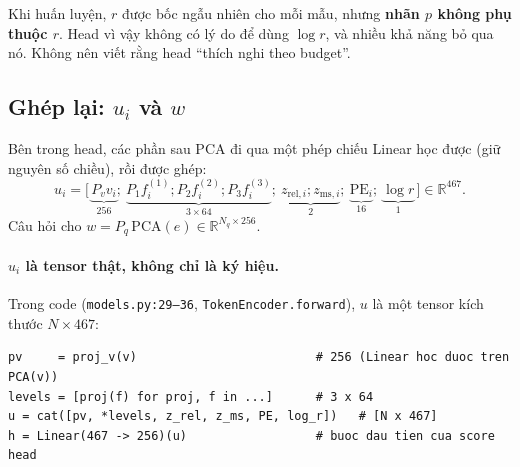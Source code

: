 \documentclass[11pt,a4paper]{article}
\newcommand{\R}{\mathbb{R}}
\newcommand{\file}[1]{\texttt{\small #1}}
\begin{document}
\begin{luuy}
Khi huấn luyện, $r$ được bốc ngẫu nhiên cho mỗi mẫu, nhưng \textbf{nhãn $p$ không phụ thuộc $r$}. Head vì vậy không có lý do để dùng $\log r$, và nhiều khả năng bỏ qua nó. Không nên viết rằng head ``thích nghi theo budget''.
\end{luuy}

\subsection{Ghép lại: $u_i$ và $w$}
Bên trong head, các phần sau PCA đi qua một phép chiếu Linear học được (giữ nguyên số chiều), rồi được ghép:
\begin{equation}
u_i=\big[\,\underbrace{P_v v_i}_{256};\ \underbrace{P_1 f_i^{(1)};P_2 f_i^{(2)};P_3 f_i^{(3)}}_{3\times64};\ \underbrace{z_{\text{rel},i};z_{\text{ms},i}}_{2};\ \underbrace{\mathrm{PE}_i}_{16};\ \underbrace{\log r}_{1}\,\big]\in\R^{467}.
\end{equation}
Câu hỏi cho $w=P_q\,\mathrm{PCA}(e)\in\R^{N_q\times256}$.

\paragraph{$u_i$ là tensor thật, không chỉ là ký hiệu.} Trong code (\file{models.py:29--36}, \file{TokenEncoder.forward}), $u$ là một tensor kích thước $N\times467$:
\begin{center}
\begin{minipage}{0.85\linewidth}
\small
\begin{verbatim}
pv     = proj_v(v)                         # 256 (Linear hoc duoc tren PCA(v))
levels = [proj(f) for proj, f in ...]      # 3 x 64
u = cat([pv, *levels, z_rel, z_ms, PE, log_r])   # [N x 467]
h = Linear(467 -> 256)(u)                  # buoc dau tien cua score head
\end{verbatim}
\end{minipage}
\end{center}
\end{document}
